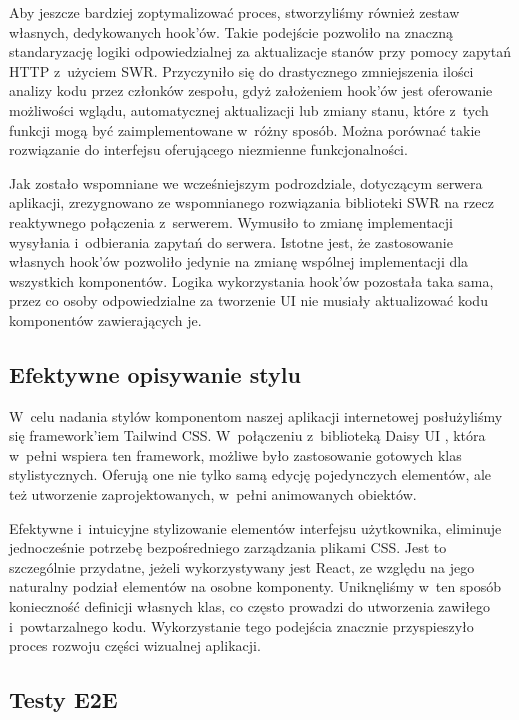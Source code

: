 Aby jeszcze bardziej zoptymalizować proces, stworzyliśmy
również zestaw własnych, dedykowanych hook'ów. Takie podejście pozwoliło na
znaczną standaryzację logiki odpowiedzialnej za aktualizacje stanów przy pomocy
zapytań HTTP z~użyciem SWR. Przyczyniło się do drastycznego zmniejszenia ilości
analizy kodu przez członków zespołu, gdyż założeniem hook'ów jest oferowanie
możliwości wglądu, automatycznej aktualizacji lub zmiany stanu, które z~tych
funkcji mogą być zaimplementowane w~różny sposób. Można porównać takie rozwiązanie
do interfejsu oferującego niezmienne funkcjonalności.


Jak zostało wspomniane we wcześniejszym podrozdziale, dotyczącym serwera aplikacji,
zrezygnowano ze wspomnianego rozwiązania biblioteki SWR na rzecz reaktywnego
połączenia z~serwerem. Wymusiło to zmianę implementacji wysyłania i~odbierania
zapytań do serwera. Istotne jest, że zastosowanie własnych hook'ów pozwoliło
jedynie na zmianę wspólnej implementacji dla wszystkich komponentów. Logika
wykorzystania hook'ów pozostała taka sama, przez co osoby odpowiedzialne za
tworzenie UI nie musiały aktualizować kodu komponentów zawierających je.

\subsection{Efektywne opisywanie stylu}
W~celu nadania stylów komponentom naszej aplikacji internetowej posłużyliśmy się
framework'iem Tailwind CSS. W~połączeniu z~biblioteką Daisy UI
\cite{DaisyUI}, która
w~pełni wspiera ten framework, możliwe było zastosowanie gotowych klas
stylistycznych. Oferują one nie tylko samą edycję pojedynczych elementów, ale też
utworzenie zaprojektowanych, w~pełni animowanych obiektów.

Efektywne i~intuicyjne stylizowanie elementów interfejsu użytkownika, eliminuje
jednocześnie potrzebę bezpośredniego zarządzania plikami CSS. Jest to szczególnie
przydatne, jeżeli wykorzystywany jest React, ze względu na jego naturalny podział
elementów na osobne komponenty. Uniknęliśmy w~ten sposób konieczność
definicji własnych klas, co często prowadzi do utworzenia zawiłego
i~powtarzalnego kodu. Wykorzystanie tego podejścia znacznie przyspieszyło
proces rozwoju części wizualnej aplikacji.


\subsection{Testy E2E}


